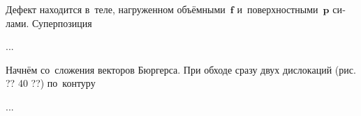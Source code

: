 

\label{para:forceonpointdefect}

\begin{otherlanguage}{russian}

Дефект находится в~теле, нагруженном объёмными~$\bm{f}$ и~поверхностными~$\bm{p}$ силами.
Суперпозиция

...


\end{otherlanguage}



\label{para:dislocations.continuouslydistributed}

\begin{otherlanguage}{russian}

Начнём со~сложения векторов Бюргерса.
При обходе сразу двух дислокаций (рис. ?? 40 ??) по~контуру

...


\end{otherlanguage}



\label{para:coilwindingstress}

